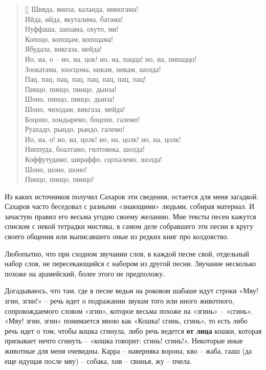 \settowidth{\versewidth}{Ио, иа, о – ио, иа, цок! ио, иа, пацца! ио, иа, пипаццо!} 
\begin{verse}[\versewidth]
Шивда, винза, каланда, миногама!\\
Ийда, ийда, якуталима, батама!\\
Нуффаша, занзама, охуто, ми!\\
Копоцо, копоцам, копоцама!\\
Ябудала, викгаза, мейда!\\
Ио, иа, о – ио, иа, цок! ио, иа, пацца! ио, иа, пипаццо!\\
Зоокатама, зоосцома, никам, никам, шолда!\\
Пац, пац, пац, пац, пац, пац, пац, пац!\\
Пинцо, пинцо, пинцо, дынза!\\
Шоно, пинцо, пинцо, дынза!\\
Шоно, чиходам, викгаза, мейда!\\
Боцопо, хондыремо, боцопо, галемо!\\
Руахадо, рындо, рындо, галемо!\\
Ио, иа, о! ио, иа, цолк! ио, иа, цолк! ио, иа, цолк!\\
Ниппуда, боалтамо, гилтовека, шолда!\\
Коффутудамо, шираффо, сцохалемо, шолда!\\
Шоно, шоно, шоно!\\
Пинцо, пинцо, пинцо!
\end{verse}

Из каких источников получил Сахаров эти сведения, остается для меня загадкой. Сахаров часто беседовал с разными «знающими» людьми, собирая материал. И зачастую правил его весьма угодно своему желанию. Мне тексты песен кажутся списком с некой тетрадки мистика, в самом деле собравшего эти песни в кругу своего общения или выписавшего оные из редких книг про колдовство.

Любопытно, что при сходном звучании слов, в каждой песне свой, отдельный набор слов, не пересекающийся с набором из другой песни. Звучание несколько похоже на арамейский, более этого не предположу.

Догадываюсь, что там, где в песне ведьм на роковом шабаше идут строки «Мяу! згин, згин!» – речь идет о подражании звукам того или иного животного, сопровождаемого словом «згин», которое весьма похоже на «згинь» – «сгинь». «Мяу! згин, згин» понимается мною как «Кошка! сгинь, сгинь», то есть либо речь идет о том, чтобы кошка сгинула, либо речь ведется \textbf{от лица} кошки, которая призывает нечто сгинуть – «кошка говорит: сгинь! сгинь!». Некоторые иные животные для меня очевидны. Карра – наверняка ворона, кво – жаба, гааш (да еще идущая после мяу) – собака, хив – свинья, жу – пчела.

